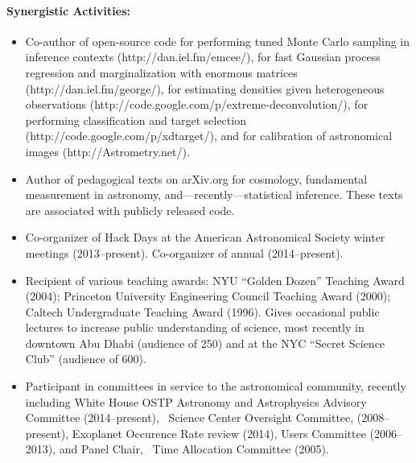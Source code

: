 \documentclass[12pt]{article}
\begin{document}
\paragraph{Synergistic Activities:}
\begin{itemize}\setlength{\itemsep}{0pt}
\item
Co-author of open-source code
for performing tuned Monte Carlo sampling in inference contexts (http://dan.iel.fm/emcee/),
for fast Gaussian process regression and marginalization with enormous matrices (http://dan.iel.fm/george/),
for estimating densities given heterogeneous observations (http://code.google.com/p/extreme-deconvolution/),
for performing classification and target selection (http://code.google.com/p/xdtarget/),
and
for calibration of astronomical images (http://Astrometry.net/).
\item
Author of pedagogical texts on arXiv.org for cosmology, fundamental
measurement in astronomy, and---recently---statistical inference.
These texts are associated with publicly released code.
\item
Co-organizer of Hack Days at the American Astronomical Society winter meetings (2013--present).
Co-organizer of annual  (2014--present).
\item
Recipient of various teaching awards: 
NYU ``Golden Dozen'' Teaching Award (2004);
Princeton University Engineering Council Teaching Award (2000);
Caltech Undergraduate Teaching Award (1996).
Gives occasional public lectures to increase public understanding of
science, most recently in downtown Abu Dhabi (audience of 250) and at
the NYC ``Secret Science Club'' (audience of 600).
\item
Participant in committees in service to the astronomical community,
recently including
White House OSTP Astronomy and Astrophysics Advisory Committee (2014--present),
\Spitzer\ Science Center Oversight Committee, (2008--present),
 Exoplanet Occurence Rate review (2014),
 Users Committee (2006--2013),
and
Panel Chair, \Spitzer\ Time Allocation Committee (2005).
\end{itemize}
\end{document}
